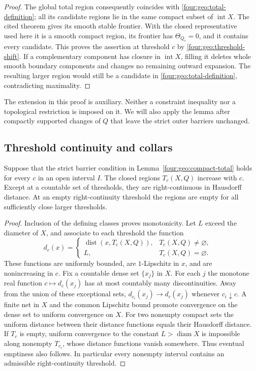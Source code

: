 \begin{proof}
The global total region consequently coincides with
\eqref{four:geo:total-definition}; all its candidate regions lie in the same
compact subset of $\operatorname{int}X$.  The cited theorem gives its smooth
stable frontier.  With the closed representative used here it is a smooth
compact region, its frontier has $\Theta_{Q_c}=0$, and it contains every
candidate.  This proves the assertion at threshold $c$ by
\eqref{four:geo:threshold-shift}.  If a complementary component has closure in
$\operatorname{int}X$, filling it deletes whole smooth boundary components
and changes no remaining outward expansion.  The resulting larger region
would still be a candidate in \eqref{four:geo:total-definition}, contradicting
maximality.
\end{proof}

The extension in this proof is auxiliary.  Neither a constraint inequality
nor a topological restriction is imposed on it.  We will also apply the
lemma after compactly supported changes of $Q$ that leave the strict outer
barriers unchanged.

\subsection{Threshold continuity and collars}

\begin{lemma}\label{four:geo:threshold-continuity}
Suppose that the strict barrier condition in Lemma~\ref{four:geo:compact-total}
holds for every $c$ in an open interval $I$.  The closed regions $T_c(X,Q)$
increase with $c$.  Except at a countable set of thresholds, they are
right-continuous in Hausdorff distance.  At an empty right-continuity
threshold the regions are empty for all sufficiently close larger
thresholds.
\end{lemma}

\begin{proof}
Inclusion of the defining classes proves monotonicity.  Let $L$ exceed the
diameter of $X$, and associate to each threshold the function
\[
 d_c(x)=\begin{cases}
 \operatorname{dist}(x,T_c(X,Q)),&T_c(X,Q)\ne\varnothing,\\
 L,&T_c(X,Q)=\varnothing.
 \end{cases}
\]
These functions are uniformly bounded, are $1$-Lipschitz in $x$, and are
nonincreasing in $c$.  Fix a countable dense set $\{x_j\}$ in $X$.  For each
$j$ the monotone real function $c\mapsto d_c(x_j)$ has at most countably
many discontinuities.  Away from the union of these exceptional sets,
$d_{c_i}(x_j)\to d_c(x_j)$ whenever $c_i\downarrow c$.  A finite net in $X$
and the common Lipschitz bound promote convergence on the dense set to
uniform convergence on $X$.  For two nonempty compact sets the uniform
distance between their distance functions equals their Hausdorff distance.
If $T_c$ is empty, uniform convergence to the constant $L>\operatorname{diam}X$
is impossible along nonempty $T_{c_i}$, whose distance functions vanish
somewhere.  Thus eventual emptiness also follows.  In particular every
nonempty interval contains an admissible right-continuity threshold.
\end{proof}

